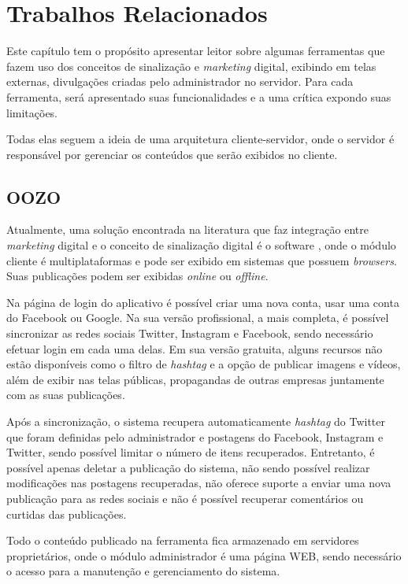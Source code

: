 \chapter[Trabalhos Relacionados]{Trabalhos Relacionados}
Este capítulo tem o propósito apresentar leitor sobre algumas ferramentas que fazem uso dos conceitos de sinalização e \textit{marketing} digital, exibindo em telas externas, divulgações criadas pelo administrador no servidor. Para cada ferramenta, será apresentado suas funcionalidades e a uma crítica expondo suas limitações.

Todas elas seguem a ideia de uma arquitetura cliente-servidor, onde o servidor é responsável por gerenciar os conteúdos que serão exibidos no cliente.

\section{OOZO}
\label{sec:oozo}
Atualmente, uma solução encontrada na literatura que faz integração entre \textit{marketing} digital e o conceito de sinalização digital é o software \cite{oozo2017}, onde o módulo cliente é multiplataformas e pode ser exibido em sistemas que possuem \textit{browsers}. Suas publicações podem ser exibidas \textit{online} ou \textit{offline}.

Na página de login do aplicativo é possível criar uma nova conta, usar uma conta do Facebook ou Google. Na sua versão profissional, a mais completa, é possível sincronizar as redes sociais Twitter, Instagram e Facebook, sendo necessário efetuar login em cada uma delas. Em sua versão gratuita, alguns recursos não estão disponíveis como o filtro de \textit{hashtag} e a opção de publicar imagens e vídeos, além de exibir nas telas públicas, propagandas de outras empresas juntamente com as suas publicações. 

Após a sincronização, o sistema recupera automaticamente \textit{hashtag} do Twitter que foram definidas pelo administrador e postagens do Facebook, Instagram e Twitter, sendo possível limitar o número de itens recuperados. Entretanto, é possível apenas deletar a publicação do sistema, não sendo possível realizar modificações nas postagens recuperadas, não oferece suporte a enviar uma nova publicação para as redes sociais e não é possível recuperar comentários ou curtidas das publicações.

Todo o conteúdo publicado na ferramenta fica armazenado em servidores proprietários, onde o módulo administrador é uma página WEB, sendo necessário o acesso para a manutenção e gerenciamento do sistema. 

